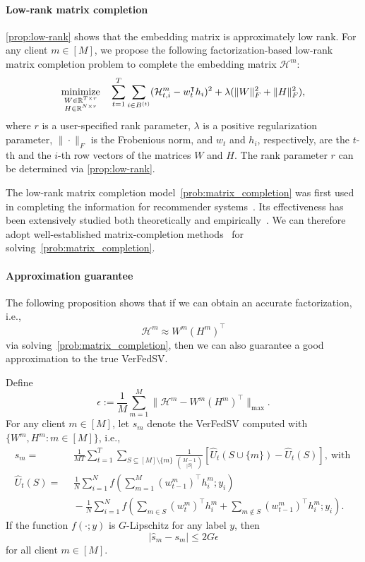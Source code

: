 \paragraph{Low-rank matrix completion}
\autoref{prop:low-rank} shows that the embedding matrix is approximately low rank. For any client $m \in [M]$, we propose the following factorization-based low-rank matrix completion problem to complete the embedding matrix $\mathcal{H}^m$: 
\begin{equation}
\label{prob:matrix_completion}
\displaystyle\mathop{\hbox{\rm minimize}}_{\substack{W \in \mathbb{R}^{T \times r}\\ H \in \mathbb{R}^{N \times r}}}\enspace \enspace \sum_{t=1}^T\sum_{i \in B^{(t)}} (\mathcal{H}^m_{t,i} - w_t^\intercal h_i)^2 + 
\lambda(\|W\|_F^2 + \|H\|_F^2),
\end{equation}
where $r$ is a user-specified rank parameter, $\lambda$ is a positive regularization parameter, $\|\cdot\|_F$ is the Frobenious norm, and $w_t$ and $h_i$, respectively, are the $t$-th and the $i$-th row vectors of the matrices $W$ and $H$. The rank parameter $r$ can be determined via \autoref{prop:low-rank}. 

The low-rank matrix completion model~\eqref{prob:matrix_completion} was first used in completing the information for recommender systems~\cite{koren2009matrix}. Its effectiveness has been extensively studied both theoretically and empirically~\cite{keshavan2012efficient, sun2016guaranteed}.  We can therefore adopt well-established matrix-completion methods~\cite{yu2014parallel, chin2016libmf} for solving~\eqref{prob:matrix_completion}. 

\paragraph{Approximation guarantee}
The following proposition shows that if we can obtain an accurate factorization, i.e.,
\[\mathcal{H}^m \approx W^m (H^m)^\intercal\]
via solving~\eqref{prob:matrix_completion}, then we can also guarantee a good approximation to the true VerFedSV. 
\begin{proposition} \label{prop:syn_verfedsv}
    Define
    \[\epsilon := \frac{1}{M}\sum_{m=1}^M \|\mathcal{H}^m - W^m(H^m)^\intercal\|_{\max}.\]
    For any client $m \in [M]$, let $\hat s_m$ denote the VerFedSV computed with $\{W^m, H^m: m \in [M]\}$, i.e., 
    \begin{align*}
        \hat s_m = ~&~ \frac{1}{MT}\sum_{t=1}^T\sum_{S \subseteq [M] \setminus \{m\}} \frac{1}{\binom{M-1}{|S|}} [\hat U_t(S\cup\{m\}) - \hat U_t(S)], ~\text{with}~\\ 
        \hat U_t(S) = ~&~ \frac{1}{N} \sum_{i=1}^N f\left( \sum_{m=1}^M (w^m_{t-1})^\intercal h^m_i; y_i\right)\\
        ~&~ - \frac{1}{N} \sum_{i=1}^N f\left( \sum_{m\in S} (w^m_{t})^\intercal h^m_i + \sum_{m\notin S} (w^m_{t-1})^\intercal h^m_i; y_i\right).
    \end{align*}
    If the function $f(\cdot; y)$ is $G$-Lipschitz for any label $y$, then
    \[|\hat s_m - s_m| \leq 2G\epsilon\]
    for all client $m \in [M]$.
\end{proposition}


